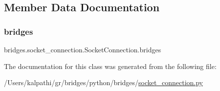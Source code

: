 \subsection{Member Data Documentation}
\mbox{\label{classbridges_1_1socket__connection_1_1_socket_connection_a81266f99e3601d2d2abeb95bd78fc602}} 
\subsubsection{\texorpdfstring{bridges}{bridges}}
{\footnotesize\ttfamily bridges.\+socket\+\_\+connection.\+Socket\+Connection.\+bridges}



The documentation for this class was generated from the following file\+:\begin{DoxyCompactItemize}
\item 
/\+Users/kalpathi/gr/bridges/python/bridges/\mbox{\hyperlink{socket__connection_8py}{socket\+\_\+connection.\+py}}\end{DoxyCompactItemize}
